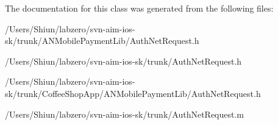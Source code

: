 The documentation for this class was generated from the following files:\begin{DoxyCompactItemize}
\item 
/Users/Shiun/labzero/svn-\/aim-\/ios-\/sk/trunk/ANMobilePaymentLib/AuthNetRequest.h\item 
/Users/Shiun/labzero/svn-\/aim-\/ios-\/sk/trunk/AuthNetRequest.h\item 
/Users/Shiun/labzero/svn-\/aim-\/ios-\/sk/trunk/CoffeeShopApp/ANMobilePaymentLib/AuthNetRequest.h\item 
/Users/Shiun/labzero/svn-\/aim-\/ios-\/sk/trunk/AuthNetRequest.m\end{DoxyCompactItemize}
